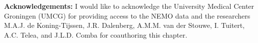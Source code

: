 \vspace{5mm} %

\noindent\textbf{Acknowledgements:} I would like to acknowledge the University Medical Center Groningen (UMCG) for providing access to the NEMO data and the researchers M.A.J. de Koning-Tijssen, J.R. Dalenberg, A.M.M. van der Stouwe, I. Tuitert, A.C. Telea, and J.L.D. Comba for coauthoring this chapter.